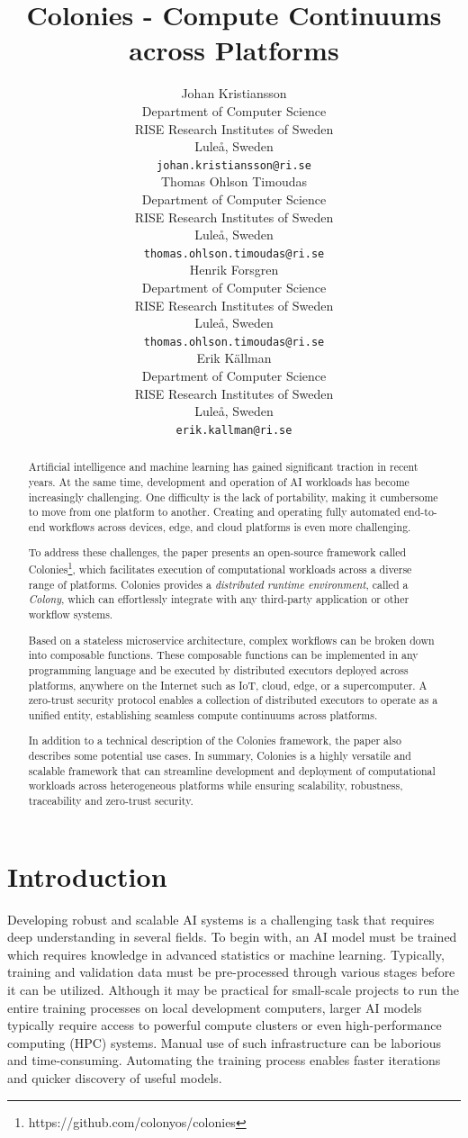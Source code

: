 \documentclass{article}
\title{Colonies - Compute Continuums across Platforms}
\author{{\hspace{1mm}Johan Kristiansson} \\
	Department of Computer Science \\
	RISE Research Institutes of Sweden \\
	Luleå, Sweden \\
	\texttt{johan.kristiansson@ri.se} \\
	\And
	{\hspace{1mm}Thomas Ohlson Timoudas} \\
	Department of Computer Science \\
	RISE Research Institutes of Sweden \\
	Luleå, Sweden \\
	\texttt{thomas.ohlson.timoudas@ri.se} \\
	\And
	{\hspace{1mm}Henrik Forsgren} \\
	Department of Computer Science \\
	RISE Research Institutes of Sweden \\
	Luleå, Sweden \\
	\texttt{thomas.ohlson.timoudas@ri.se} \\
	\And
	{\hspace{1mm}Erik Källman} \\
	Department of Computer Science \\
	RISE Research Institutes of Sweden \\
	Luleå, Sweden \\
	\texttt{erik.kallman@ri.se} \\
}
\begin{document}
\maketitle

\begin{abstract}
Artificial intelligence and machine learning has gained significant traction in recent years. At the same time, development and operation of AI workloads has become increasingly challenging. One difficulty is the lack of portability, making it cumbersome to move from one platform to another. Creating and operating fully automated end-to-end workflows across devices, edge, and cloud platforms is even more challenging. 

To address these challenges, the paper presents an open-source framework called Colonies\footnote{https://github.com/colonyos/colonies}, which facilitates execution of computational workloads across a diverse range of platforms. Colonies provides a \emph{distributed runtime environment}, called a \emph{Colony}, which can effortlessly integrate with any third-party application or other workflow systems.

Based on a stateless microservice architecture, complex workflows can be broken down into composable functions. These composable functions can be implemented in any programming language and be executed by distributed executors deployed across platforms, anywhere on the Internet such as IoT, cloud, edge, or a supercomputer. A zero-trust security protocol enables a collection of distributed executors to operate as a unified entity, establishing seamless compute continuums across platforms.

In addition to a technical description of the Colonies framework, the paper also describes some potential use cases. In summary, Colonies is a highly versatile and scalable framework that can streamline development and deployment of computational workloads across heterogeneous platforms while ensuring scalability, robustness, traceability and zero-trust security.
\end{abstract}


\section{Introduction}
Developing robust and scalable AI systems is a challenging task that requires deep understanding in several fields. To begin with, an AI model must be trained which requires knowledge in advanced statistics or machine learning. Typically, training and validation data must be pre-processed through various stages before it can be utilized. Although it may be practical for small-scale projects to run the entire training processes on local development computers, larger AI models typically require access to powerful compute clusters or even high-performance computing (HPC) systems. Manual use of such infrastructure can be laborious and time-consuming. Automating the training process enables faster iterations and quicker discovery of useful models.
\end{document}
